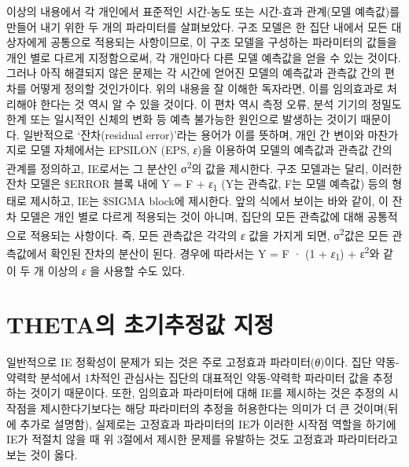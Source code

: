 \documentclass[
  10pt,
  krantz2,
  a4paper]{krantz}
\theoremstyle{definition}
\theoremstyle{definition}
\theoremstyle{definition}
\theoremstyle{remark}
\begin{document}
이상의 내용에서 각 개인에서 표준적인 시간-농도 또는 시간-효과 관계(모델 예측값)를 만들어 내기 위한 두 개의 파라미터를 살펴보았다. 구조 모델은 한 집단 내에서 모든 대상자에게 공통으로 적용되는 사항이므로, 이 구조 모델을 구성하는 파라미터의 값들을 개인 별로 다르게 지정함으로써, 각 개인마다 다른 모델 예측값을 얻을 수 있는 것이다. 그러나 아직 해결되지 않은 문제는 각 시간에 얻어진 모델의 예측값과 관측값 간의 편차를 어떻게 정의할 것인가이다. 위의 내용을 잘 이해한 독자라면, 이를 임의효과로 처리해야 한다는 것 역시 알 수 있을 것이다. 이 편차 역시 측정 오류, 분석 기기의 정밀도 한계 또는 일시적인 신체의 변화 등 예측 불가능한 원인으로 발생하는 것이기 때문이다. 일반적으로 `잔차(residual error)'라는 용어가 이를 뜻하며, 개인 간 변이와 마찬가지로 모델 자체에서는 EPSILON (EPS, \emph{ε})을 이용하여 모델의 예측값과 관측값 간의 관계를 정의하고, IE로서는 그 분산인 σ\textsuperscript{2}의 값을 제시한다. 구조 모델과는 달리, 이러한 잔차 모델은 \$ERROR 블록 내에 Y = F + \emph{ε}\textsubscript{1} (Y는 관측값, F는 모델 예측값) 등의 형태로 제시하고, IE는 \$SIGMA block에 제시한다. 앞의 식에서 보이는 바와 같이, 이 잔차 모델은 개인 별로 다르게 적용되는 것이 아니며, 집단의 모든 관측값에 대해 공통적으로 적용되는 사항이다. 즉, 모든 관측값은 각각의 \emph{ε} 값을 가지게 되면, σ\textsuperscript{2}값은 모든 관측값에서 확인된 잔차의 분산이 된다. 경우에 따라서는 Y = F · (1 + \emph{ε}\textsubscript{1}) + ε\textsuperscript{2}와 같이 두 개 이상의 \emph{ε} 을 사용할 수도 있다.

\hypertarget{thetauxc758-uxcd08uxae30uxcd94uxc815uxac12-uxc9c0uxc815}{%
\section{THETA의 초기추정값 지정}\label{thetauxc758-uxcd08uxae30uxcd94uxc815uxac12-uxc9c0uxc815}}

일반적으로 IE 정확성이 문제가 되는 것은 주로 고정효과 파라미터(\emph{θ})이다. 집단 약동-약력학 분석에서 1차적인 관심사는 집단의 대표적인 약동-약력학 파라미터 값을 추정하는 것이기 때문이다. 또한, 임의효과 파라미터에 대해 IE를 제시하는 것은 추정의 시작점을 제시한다기보다는 해당 파라미터의 추정을 허용한다는 의미가 더 큰 것이며(뒤에 추가로 설명함), 실제로는 고정효과 파라미터의 IE가 이러한 시작점 역할을 하기에 IE가 적절치 않을 때 위 3절에서 제시한 문제를 유발하는 것도 고정효과 파라미터라고 보는 것이 옳다.
\end{document}
